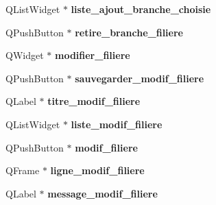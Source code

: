 \begin{DoxyCompactItemize}
\item 
\hypertarget{class_ui___administration_a7e42e599101aa45d92c47e4845517016}{Q\+List\+Widget $\ast$ {\bfseries liste\+\_\+ajout\+\_\+branche\+\_\+choisie}}\label{class_ui___administration_a7e42e599101aa45d92c47e4845517016}

\item 
\hypertarget{class_ui___administration_a528ece55a78189d9999829ebecaf7bf5}{Q\+Push\+Button $\ast$ {\bfseries retire\+\_\+branche\+\_\+filiere}}\label{class_ui___administration_a528ece55a78189d9999829ebecaf7bf5}

\item 
\hypertarget{class_ui___administration_a6fc680299420fa793d307ad5193801aa}{Q\+Widget $\ast$ {\bfseries modifier\+\_\+filiere}}\label{class_ui___administration_a6fc680299420fa793d307ad5193801aa}

\item 
\hypertarget{class_ui___administration_aca75284a46ad9ac0e0650530f70039e8}{Q\+Push\+Button $\ast$ {\bfseries sauvegarder\+\_\+modif\+\_\+filiere}}\label{class_ui___administration_aca75284a46ad9ac0e0650530f70039e8}

\item 
\hypertarget{class_ui___administration_ae98adc29b2e9ccabe7d63f4aea616e82}{Q\+Label $\ast$ {\bfseries titre\+\_\+modif\+\_\+filiere}}\label{class_ui___administration_ae98adc29b2e9ccabe7d63f4aea616e82}

\item 
\hypertarget{class_ui___administration_a8852a2cb6d190471c255ada985fd3d16}{Q\+List\+Widget $\ast$ {\bfseries liste\+\_\+modif\+\_\+filiere}}\label{class_ui___administration_a8852a2cb6d190471c255ada985fd3d16}

\item 
\hypertarget{class_ui___administration_a657b302a78ac9e8622de76b8ba92d0ce}{Q\+Push\+Button $\ast$ {\bfseries modif\+\_\+filiere}}\label{class_ui___administration_a657b302a78ac9e8622de76b8ba92d0ce}

\item 
\hypertarget{class_ui___administration_a4e33f8c631659eca0456d0d26a066d94}{Q\+Frame $\ast$ {\bfseries ligne\+\_\+modif\+\_\+filiere}}\label{class_ui___administration_a4e33f8c631659eca0456d0d26a066d94}

\item 
\hypertarget{class_ui___administration_aaf326e171ee48cc9ad5923e2a735bb80}{Q\+Label $\ast$ {\bfseries message\+\_\+modif\+\_\+filiere}}\label{class_ui___administration_aaf326e171ee48cc9ad5923e2a735bb80}


\end{DoxyCompactItemize}
